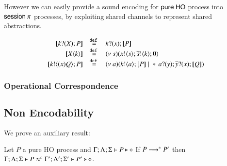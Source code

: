 However we can easily provide a sound encoding for $\mathsf{pure\ HO}$
process into $\mathsf{session\ }\pi$ processes, by exploiting shared channels
to represent shared abstractions.

\[
\begin{array}{rcl}
	\map{\binp{k}{\X} P} &\defeq& \binp{k}{x} \map{P}\\
	\map{\appl{\X}{k}} &\defeq& \newsp{s}{\bout{x}{s} \bout{\dual{s}}{k} \inact}\\
	\map{\bout{k}{\abs{x} Q} P} &\defeq& \newsp{a}{\bout{k}{a} \map{P} \Par \repl{} \binp{a}{y} \binp{\dual{y}}{x} \map{Q}}
\end{array}
\]

\subsubsection{Operational Correspondence}


\subsection{Non Encodability}

We prove an auxiliary result:

\begin{lemma}
	\label{lem:tau_inert}
	Let $P$ a pure HO process
	and $\Gamma; \Lambda; \Sigma \vdash P \triangleright \diamond$
	If $P \longrightarrow^* P'$ then
	$\Gamma; \Lambda; \Sigma \vdash P \approx^{c} \Gamma'; \Lambda'; \Sigma' \vdash P' \triangleright \diamond$.
\end{lemma}

